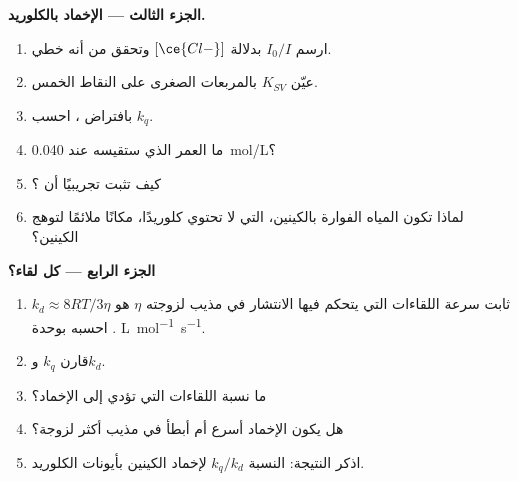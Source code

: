 \begin{problem}
\medskip\noindent\textbf{الجزء الثالث --- الإخماد بالكلوريد.}
\begin{enumerate}[resume]
  \item ارسم $I_0/I$ بدلالة $[\ce{Cl-}]$ وتحقق من أنه خطي.
  \item عيّن $K_{SV}$ بالمربعات الصغرى على النقاط الخمس.
  \item بافتراض ، احسب $k_q$.
  \item ما العمر الذي ستقيسه عند \qty{0.040}{mol/L}؟
  \item كيف تثبت تجريبيًا أن ؟
  \item لماذا تكون المياه الفوارة بالكينين، التي لا تحتوي كلوريدًا، مكانًا ملائمًا لتوهج
        الكينين؟
\end{enumerate}

\medskip\noindent\textbf{الجزء الرابع --- كل لقاء؟}
\begin{enumerate}[resume]
  \item ثابت سرعة اللقاءات التي يتحكم فيها الانتشار في مذيب
        لزوجته $\eta$ هو $k_d \approx 8RT/3\eta$. احسبه بوحدة \unit{L.mol^{-1}.s^{-1}}.
  \item قارن $k_q$ و$k_d$.
  \item ما نسبة اللقاءات التي تؤدي إلى الإخماد؟
  \item هل يكون الإخماد أسرع أم أبطأ في مذيب أكثر لزوجة؟
  \item اذكر النتيجة: النسبة $k_q/k_d$ لإخماد الكينين بأيونات
        الكلوريد.
\end{enumerate}
\end{problem}
